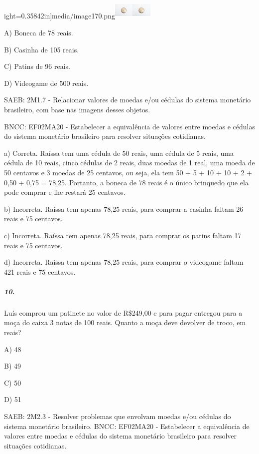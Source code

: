 ight=0.35842in]{media/image170.png}\includegraphics[width=0.36805in,height=0.35842in]{media/image170.png}\includegraphics[width=0.36805in,height=0.35842in]{media/image170.png}

A) Boneca de 78 reais.

B) Casinha de 105 reais.

C) Patins de 96 reais.

D) Videogame de 500 reais.

SAEB: 2M1.7 - Relacionar valores de moedas e/ou cédulas do sistema
monetário brasileiro, com base nas imagens desses objetos.

BNCC: EF02MA20 - Estabelecer a equivalência de valores entre moedas e
cédulas do sistema monetário brasileiro para resolver situações
cotidianas.

a) Correta. Raíssa tem uma cédula de 50 reais, uma cédula de 5 reais,
uma cédula de 10 reais, cinco cédulas de 2 reais, duas moedas de 1 real,
uma moeda de 50 centavos e 3 moedas de 25 centavos, ou seja, ela tem 50
+ 5 + 10 + 10 + 2 + 0,50 + 0,75 = 78,25. Portanto, a boneca de 78 reais
é o único brinquedo que ela pode comprar e lhe restará 25 centavos.

b) Incorreta. Raíssa tem apenas 78,25 reais, para comprar a casinha
faltam 26 reais e 75 centavos.

c) Incorreta. Raíssa tem apenas 78,25 reais, para comprar os patins
faltam 17 reais e 75 centavos.

d) Incorreta. Raíssa tem apenas 78,25 reais, para comprar o videogame
faltam 421 reais e 75 centavos.

\subparagraph{10. }\label{section-154}

Luís comprou um patinete no valor de R\$249,00 e para pagar entregou
para a moça do caixa 3 notas de 100 reais. Quanto a moça deve devolver
de troco, em reais?

A) 48

B) 49

C) 50

D) 51

SAEB: 2M2.3 - Resolver problemas que envolvam moedas e/ou cédulas do
sistema monetário brasileiro. BNCC: EF02MA20 - Estabelecer a
equivalência de valores entre moedas e cédulas do sistema monetário
brasileiro para resolver situações cotidianas.

